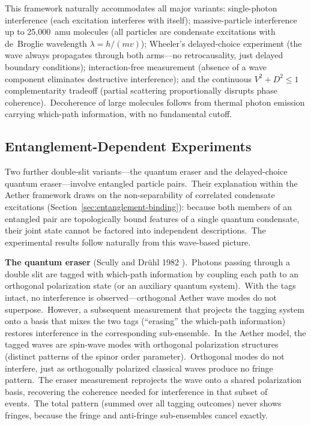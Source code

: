 ﻿\documentclass[12pt,letterpaper]{article}
\begin{document}
This framework naturally accommodates all major variants: single-photon
interference \cite{taylor1909,grangier1986} (each excitation interferes with
itself); massive-particle interference up to 25{,}000~amu molecules
\cite{fein2019} (all particles are condensate excitations with de~Broglie
wavelength $\lambda = h/(mv)$); Wheeler's delayed-choice experiment
\cite{wheeler1978,jacques2007} (the wave always propagates through both
arms---no retrocausality, just delayed boundary conditions);
interaction-free measurement \cite{elitzurvaidman1993,kwiat1995} (absence
of a wave component eliminates destructive interference); and the continuous
$V^2 + D^2 \leq 1$ complementarity tradeoff \cite{englert1996} (partial
scattering proportionally disrupts phase coherence).\ Decoherence of large
molecules follows from thermal photon emission carrying which-path
information, with no fundamental cutoff.


\subsection{Entanglement-Dependent Experiments}

Two further double-slit variants---the quantum eraser and the delayed-choice
quantum eraser---involve entangled particle pairs.\ Their explanation within the
Aether framework draws on the non-separability of correlated condensate
excitations (Section~\ref{sec:entanglement-binding}): because both members of an
entangled pair are topologically bound features of a single quantum condensate,
their joint state cannot be factored into independent descriptions.\ The
experimental results follow naturally from this wave-based picture.

\textbf{The quantum eraser} (Scully and Dr\"uhl 1982 \cite{scullydruhl1982}).\ Photons
passing through a double slit are tagged with which-path information by coupling
each path to an orthogonal polarization state (or an auxiliary quantum system).\
With the tags intact, no interference is observed---orthogonal Aether wave modes
do not superpose.\ However, a subsequent measurement that projects the tagging
system onto a basis that mixes the two tags (``erasing'' the which-path
information) restores interference in the corresponding sub-ensemble.\ In the
Aether model, the tagged waves are spin-wave modes with orthogonal
polarization structures (distinct patterns of the spinor order parameter).\ Orthogonal modes do not interfere, just as orthogonally polarized classical
waves produce no fringe pattern.\ The eraser measurement reprojects the wave
onto a shared polarization basis, recovering the coherence needed for
interference in that subset of events.\ The total pattern (summed over all
tagging outcomes) never shows fringes, because the fringe and anti-fringe
sub-ensembles cancel exactly.
\end{document}
